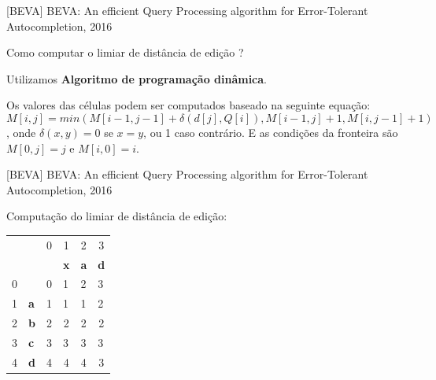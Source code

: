 \documentclass[11pt]{beamer}
\begin{document}
\begin{frame}{[BEVA] BEVA: An efficient Query Processing algorithm for Error-Tolerant Autocompletion, 2016}

    Como computar o limiar de distância de edição ? \pause
    
    Utilizamos \textbf{Algoritmo de programação dinâmica}. \pause 
    
    Os valores das células podem ser computados baseado na seguinte equação: \[ M[i, j] = min(M[i - 1, j - 1] + \delta(d[j], Q[i]), M[i - 1, j] + 1, M[i, j - 1] + 1) \], onde $\delta(x, y) = 0$ se $x = y$, ou 1 caso contrário. E as condições da fronteira são $M[0, j] = j$ e $M[i, 0] = i$.
    
\end{frame}

\begin{frame}{[BEVA] BEVA: An efficient Query Processing algorithm for Error-Tolerant Autocompletion, 2016}

    Computação do limiar de distância de edição:
  
    \begin{table}[]
    \begin{tabular}{llllll}
     &  & \multicolumn{1}{c}{{\color[HTML]{656565} 0}} & \multicolumn{1}{c}{{\color[HTML]{656565} 1}} & \multicolumn{1}{c}{{\color[HTML]{656565} 2}} & \multicolumn{1}{c}{{\color[HTML]{656565} 3}} \\
     &  &  & \textbf{x} & \textbf{a} & \textbf{d} \\ \cline{3-6} 
    {\color[HTML]{656565} 0} & \multicolumn{1}{l|}{} & \multicolumn{1}{l|}{{\color[HTML]{000000} 0}} & \multicolumn{1}{l|}{{\color[HTML]{000000} 1}} & \multicolumn{1}{l|}{{\color[HTML]{000000} 2}} & \multicolumn{1}{l|}{{\color[HTML]{000000} 3}} \\ \cline{3-6} 
    {\color[HTML]{656565} 1} & \multicolumn{1}{l|}{\textbf{a}} & \multicolumn{1}{l|}{{\color[HTML]{000000} 1}} & \multicolumn{1}{l|}{{\color[HTML]{000000} 1}} & \multicolumn{1}{l|}{{\color[HTML]{000000} 1}} & \multicolumn{1}{l|}{{\color[HTML]{000000} 2}} \\ \cline{3-6} 
    {\color[HTML]{656565} 2} & \multicolumn{1}{l|}{\textbf{b}} & \multicolumn{1}{c|}{{\color[HTML]{000000} 2}} & \multicolumn{1}{c|}{{\color[HTML]{000000} 2}} & \multicolumn{1}{c|}{{\color[HTML]{000000} 2}} & \multicolumn{1}{c|}{{\color[HTML]{000000} 2}} \\ \cline{3-6} 
    {\color[HTML]{656565} 3} & \multicolumn{1}{l|}{\textbf{c}} & \multicolumn{1}{l|}{{\color[HTML]{000000} 3}} & \multicolumn{1}{l|}{{\color[HTML]{000000} 3}} & \multicolumn{1}{l|}{{\color[HTML]{000000} 3}} & \multicolumn{1}{l|}{{\color[HTML]{000000} 3}} \\ \cline{3-6} 
    {\color[HTML]{656565} 4} & \multicolumn{1}{l|}{\textbf{d}} & \multicolumn{1}{c|}{{\color[HTML]{000000} 4}} & \multicolumn{1}{c|}{{\color[HTML]{000000} 4}} & \multicolumn{1}{c|}{{\color[HTML]{000000} 4}} & \multicolumn{1}{c|}{{\color[HTML]{000000} 3}} \\ \cline{3-6} 
    \end{tabular}
    \end{table}
    

\end{frame}
\end{document}
